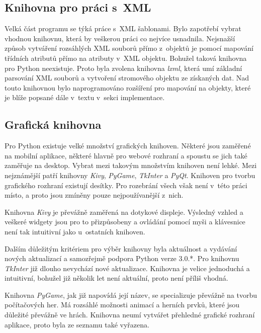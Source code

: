 \documentclass[thesis=B,czech]{resources/FITthesis}[2012/06/26]
\begin{document}
\subsection{Knihovna pro práci s~XML}

Velká část programu se týká práce s~XML šablonami. Bylo zapotřebí vybrat vhodnou knihovnu, která by veškerou práci co nejvíce usnadnila. Nejsnažší způsob vytváření rozsáhlých XML souborů přímo z~objektů je pomocí mapování třídních atributů přímo na atributy v~XML objektu. Bohužel taková knihovna pro Python neexistuje. Proto byla zvolena knihovna \textit{lxml}\cite{lxml}, která umí základní parsování XML souborů a vytvoření stromového objektu ze získaných dat. Nad touto knihovnou bylo naprogramováno rozšíření pro mapování na objekty, které je blíže popsané dále v~textu v~sekci implementace.



\subsection{Grafická knihovna}
Pro Python existuje velké množství grafických knihoven. Některé jsou zaměřené na mobilní aplikace, některé hlavně pro webové rozhraní a spoustu se jich také zaměřuje na desktop. Vybrat mezi takovým množstvím knihoven není lehké. Mezi nejznámější patří knihovny \textit{Kivy}, \textit{PyGame}, \textit{TkInter} a \textit{PyQt}. Knihoven pro tvorbu grafického rozhraní existují desítky. Pro rozebrání všech však není v~této práci místo, a proto jsou zmíněny pouze nejpoužívanější z~nich.\par

Knihovna \textit{Kivy} je převážně zaměřená na dotykové displeje. Výsledný vzhled a veškeré widgety jsou pro to přizpůsobeny a ovládání pomocí myši a klávesnice není tak intuitivní jako u~ostatních knihoven.\par

Dalším důležitým kritériem pro výběr knihovny byla aktuálnost a vydávání nových aktualizací a samozřejmě podpora Python verze 3.0.*. Pro knihovnu \textit{TkInter} již dlouho nevychází nové aktualizace. Knihovna je velice jednoduchá a intuitivní, bohužel již několik let není aktuální, proto není příliš vhodná. \par

Knihovna \textit{PyGame}, jak již napovídá její název, se specializuje převážně na tvorbu počítačových her. Má rozsáhlé možnosti animací a herních prvků, které jsou důležité převážně ve hrách. Knihovna neumí vytvářet přehledné grafické rozhraní aplikace, proto byla ze seznamu také vyřazena.\par
\end{document}
